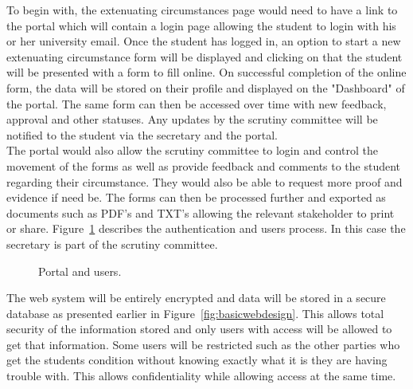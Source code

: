 \documentclass[../main.tex]{subfiles}
\begin{document}
\raggedright

To begin with, the extenuating circumstances page\cite{ecfuni} would need to have a link to the portal which will contain a login page allowing the student to login with his or her university email. Once the student has logged in, an option to start a new extenuating circumstance form will be displayed and clicking on that the student will be presented with a form to fill online. On successful completion of the online form, the data will be stored on their profile and displayed on the "Dashboard" of the portal. The same form can then be accessed over time with new feedback, approval and other statuses. Any updates by the scrutiny committee will be notified to the student via the secretary and the portal. \\[4mm]

The portal would also allow the scrutiny committee to login and control the movement of the forms as well as provide feedback and comments to the student regarding their circumstance. They would also be able to request more proof and evidence if need be. The forms can then be processed further and exported as documents such as PDF's and TXT's allowing the relevant stakeholder to print or share. Figure~\ref{fig:portal1} describes the authentication and users process. In this case the secretary is part of the scrutiny committee. 

	\begin{figure}[H]
        \caption{\label{fig:portal1} Portal and users.}
      \end{figure}

The web system will be entirely encrypted and data will be stored in a secure database as presented earlier in Figure~\ref{fig:basicwebdesign}. This allows total security of the information stored and only users with access will be allowed to get that information. Some users will be restricted such as the other parties who get the students condition without knowing exactly what it is they are having trouble with. This allows confidentiality while allowing access at the same time. \\[4mm]
\end{document}
